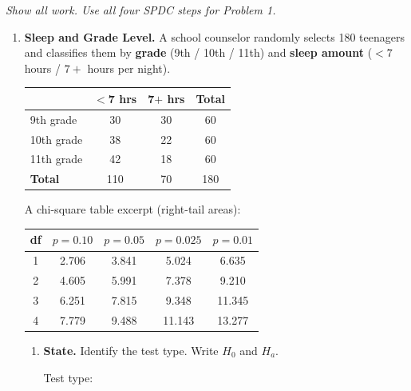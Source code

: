 \documentclass[10pt]{article}
\begin{document}
\namedateperiod

\vspace{0.08in}

\textit{Show all work. Use all four SPDC steps for Problem 1.}

\begin{enumerate}[itemsep=10pt]

\item \textbf{Sleep and Grade Level.}
A school counselor randomly selects 180 teenagers and classifies them by
\textbf{grade} (9th / 10th / 11th) and \textbf{sleep amount} ($<7$ hours / $7{+}$ hours per night).

\renewcommand{\arraystretch}{1.4}
\begin{center}
\begin{tabular}{@{} l c c c @{}}
\hline
           & \textbf{$<$7 hrs} & \textbf{7$+$ hrs} & \textbf{Total} \\
\hline
9th grade  & 30 & 30 & 60  \\
10th grade & 38 & 22 & 60  \\
11th grade & 42 & 18 & 60  \\
\hline
\textbf{Total} & 110 & 70 & 180 \\
\hline
\end{tabular}
\end{center}

A chi-square table excerpt (right-tail areas):

\renewcommand{\arraystretch}{1.3}
\begin{center}\small
\begin{tabular}{@{} c c c c c @{}}
\hline
\textbf{df} & $p = 0.10$ & $p = 0.05$ & $p = 0.025$ & $p = 0.01$ \\
\hline
1  & 2.706  & 3.841  & 5.024  & 6.635  \\
2  & 4.605  & 5.991  & 7.378  & 9.210  \\
3  & 6.251  & 7.815  & 9.348  & 11.345 \\
4  & 7.779  & 9.488  & 11.143 & 13.277 \\
\hline
\end{tabular}
\end{center}

\begin{enumerate}[label=\alph*., itemsep=6pt]
  \item \textbf{State.} Identify the test type. Write $H_0$ and $H_a$.

        Test type: \blank{5cm}


\end{enumerate}
\end{enumerate}
\end{document}
